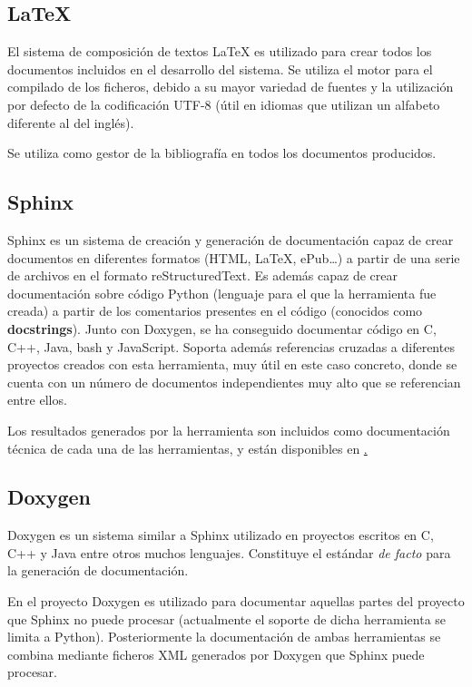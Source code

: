 \subsection{{\LaTeX}}

El sistema de composición de textos {\LaTeX} es utilizado para crear todos los documentos incluidos en el desarrollo del sistema. Se utiliza el motor {\XeLaTeX} para el compilado de los ficheros, debido a su mayor variedad de fuentes y la utilización por defecto de la codificación UTF-8 (útil en idiomas que utilizan un alfabeto diferente al del inglés). 

Se utiliza {\BibTeX} como gestor de la bibliografía en todos los documentos producidos.

\subsection{Sphinx}

Sphinx es un sistema de creación y generación de documentación capaz de crear documentos en diferentes formatos (HTML, \LaTeX, ePub\dots) a partir de una serie de archivos en el formato reStructuredText. Es además capaz de crear documentación sobre código Python (lenguaje para el que la herramienta fue creada) a partir de los comentarios presentes en el código (conocidos como \textbf{docstrings}). Junto con Doxygen, se ha conseguido documentar código en C, C++, Java, bash y JavaScript. Soporta además referencias cruzadas a diferentes proyectos creados con esta herramienta, muy útil en este caso concreto, donde se cuenta con un número de documentos independientes muy alto que se referencian entre ellos.

Los resultados generados por la herramienta son incluidos como documentación técnica de cada una de las herramientas, y están disponibles en \href{marcopolo.martinarroyo.net}.

\subsection{Doxygen}

Doxygen es un sistema similar a Sphinx utilizado en proyectos escritos en C, C++ y Java entre otros muchos lenguajes. Constituye el estándar \textit{de facto} para la generación de documentación.

En el proyecto Doxygen es utilizado para documentar aquellas partes del proyecto que Sphinx no puede procesar (actualmente el soporte de dicha herramienta se limita a Python). Posteriormente la documentación de ambas herramientas se combina mediante ficheros XML generados por Doxygen que Sphinx puede procesar.

